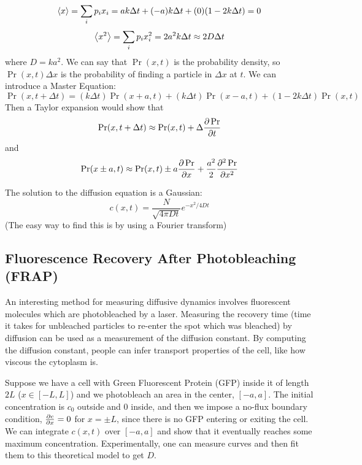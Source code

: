 \documentclass[a4paper,twoside,master.tex]{subfiles}
\begin{document}
\begin{equation}
    \ev{x} = \sum_i p_i x_i = a k \Delta t + (-a)k \Delta t + (0)(1 - 2 k \Delta t) = 0
\end{equation}
\begin{equation}
    \ev{x^2} = \sum_i p_i x_i^2 = 2 a^2 k \Delta t \approx 2 D \Delta t
\end{equation}
where $ D = k a^2 $. We can say that $ \Pr(x,t) $ is the probability density, so $ \Pr(x,t) \Delta x $ is the probability of finding a particle in $ \Delta x $ at $ t $. We can introduce a Master Equation:
\begin{equation}
    \Pr(x, t + \Delta t) = (k \Delta t) \Pr(x+a, t) + (k \Delta t) \Pr(x-a, t) + (1-2k \Delta t) \Pr(x,t)
\end{equation}
Then a Taylor expansion would show that
\begin{equation}
    \Pr(x, t + \Delta t) \approx \Pr(x,t) + \Delta \pdv{\Pr}{t}
\end{equation}
and
\begin{equation}
    \Pr(x \pm a, t) \approx \Pr(x,t) \pm a \pdv{\Pr}{x} + \frac{a^2}{2} \pdv[2]{\Pr}{x}
\end{equation}

The solution to the diffusion equation is a Gaussian:
\begin{equation}
    c(x,t) = \frac{N}{\sqrt{4 \pi D t}} e^{- x^2 / 4 D t}
\end{equation}
(The easy way to find this is by using a Fourier transform)

\subsection{Fluorescence Recovery After Photobleaching (FRAP)}\label{sub:fluorescence_recovery_after_photobleaching_(frap)}

An interesting method for measuring diffusive dynamics involves fluorescent molecules which are photobleached by a laser. Measuring the recovery time (time it takes for unbleached particles to re-enter the spot which was bleached) by diffusion can be used as a measurement of the diffusion constant. By computing the diffusion constant, people can infer transport properties of the cell, like how viscous the cytoplasm is.

Suppose we have a cell with Green Fluorescent Protein (GFP) inside it of length $ 2L $ ($ x \in [-L, L] $) and we photobleach an area in the center, $ [-a, a] $. The initial concentration is $ c_0 $ outside and $ 0 $ inside, and then we impose a no-flux boundary condition, $ \pdv{c}{x} = 0 $ for $ x = \pm L $, since there is no GFP entering or exiting the cell. We can integrate $ c(x,t) $ over $ [-a,a] $ and show that it eventually reaches some maximum concentration. Experimentally, one can measure curves and then fit them to this theoretical model to get $ D $. 
\end{document}
